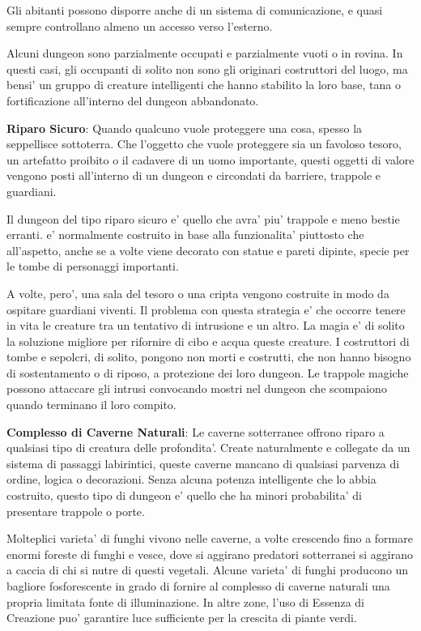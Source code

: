 \documentclass[a4paper,11pt,twoside,openany]{dndbook}
\begin{document}
Gli abitanti possono disporre anche di un sistema di comunicazione, e quasi sempre
controllano almeno un accesso verso l'esterno.

Alcuni dungeon sono parzialmente occupati e parzialmente vuoti o in rovina. In questi casi, gli occupanti di solito non sono gli originari costruttori del luogo, ma bensi' un gruppo di creature intelligenti che hanno stabilito la loro base, tana o fortificazione all'interno del dungeon abbandonato.

\textbf{Riparo Sicuro}: Quando qualcuno vuole proteggere una cosa, spesso la seppellisce sottoterra. Che l'oggetto che vuole proteggere sia un favoloso tesoro, un artefatto proibito o il cadavere di un uomo importante, questi oggetti di valore vengono posti all'interno di un dungeon e circondati da barriere, trappole e guardiani.

Il dungeon del tipo riparo sicuro e' quello che avra' piu' trappole e meno bestie erranti. e' normalmente costruito in base alla funzionalita' piuttosto che all'aspetto, anche se a volte viene decorato con statue e pareti dipinte, specie per le tombe di personaggi importanti.

A volte, pero', una sala del tesoro o una cripta vengono costruite in modo da ospitare guardiani viventi. Il problema con questa strategia e' che occorre tenere in vita le creature tra un tentativo di intrusione e un altro. La magia e' di solito la soluzione migliore per rifornire di cibo e acqua queste creature. I costruttori di tombe e sepolcri, di solito, pongono non morti e costrutti, che non hanno bisogno di sostentamento o di riposo, a protezione dei loro dungeon. Le trappole magiche possono attaccare gli intrusi convocando mostri nel dungeon che scompaiono quando terminano il loro compito.

\textbf{Complesso di Caverne Naturali}: Le caverne sotterranee offrono riparo a qualsiasi tipo di creatura delle profondita'. Create naturalmente e collegate da un sistema di passaggi labirintici, queste caverne mancano di qualsiasi parvenza di ordine, logica o decorazioni. Senza alcuna potenza intelligente che lo abbia costruito, questo tipo di dungeon e' quello che ha minori probabilita' di presentare trappole o porte.

Molteplici varieta' di funghi vivono nelle caverne, a volte crescendo fino a formare enormi foreste di funghi e vesce, dove si aggirano predatori sotterranei si aggirano a caccia di chi si nutre di questi vegetali. Alcune varieta' di funghi producono un bagliore fosforescente in grado di fornire al complesso di caverne naturali una propria limitata fonte di illuminazione. In altre zone, l'uso di Essenza di Creazione puo' garantire luce sufficiente per la crescita di piante verdi.
\end{document}
